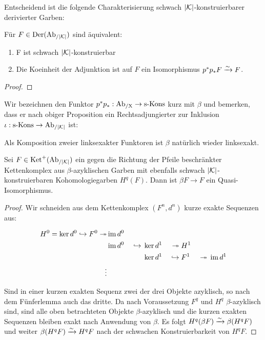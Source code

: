 Entscheidend ist die folgende Charakterisierung schwach
$|\mathcal{K}|$-konstruierbarer derivierter Garben:

\begin{prop}
  Für $F \in \operatorname{Der}(\operatorname{Ab}_{/|\mathcal{K}|})$ sind äquivalent:
  \begin{enumerate}
  \item F ist schwach $|\mathcal{K}|$-konstruierbar
  \item Die Koeinheit der Adjunktion ist auf $F$ ein Isomorphismus
    $p^*p_*F \xrightarrow{\sim} F$.
  \end{enumerate}
\end{prop}
\begin{proof}
\end{proof}


Wir bezeichnen den Funktor $p^*p_*: \operatorname{Ab_{/X}} \to \operatorname{s-Kons}$ kurz mit $\beta$
und bemerken, dass er nach obiger Proposition ein Rechtsadjungierter
zur Inklusion $\iota: \operatorname{s-Kons} \to \operatorname{Ab}_{/|\mathcal{K}|}$ ist:


Als Komposition zweier linksexakter Funktoren ist $\beta$ natürlich
wieder linksexakt. 

\begin{prop}
  Sei $F \in \operatorname{Ket}^+(\operatorname{Ab}_{/|\mathcal{K}|})$ ein gegen die Richtung der Pfeile
  beschränkter Kettenkomplex aus $\beta$-azyklischen Garben mit
  ebenfalls schwach $|\mathcal{K}|$-konstruierbaren Kohomologiegarben
  $H^q(F)$. Dann ist $\beta F \to F$ ein Quasi-Isomorphismus.
\end{prop}
\begin{proof}
  Wir schneiden aus dem Kettenkomplex $(F^n, d^n)$ kurze exakte
  Sequenzen aus:
  
  \begin{alignat*}{4}
    H^0 = \ker d^0 \hookrightarrow F^0 \twoheadrightarrow &\operatorname{im} d^0 & & \\
    &\operatorname{im} d^0& {} \hookrightarrow {} &\ker d^1& {}\twoheadrightarrow {} &H^1& \\
    && &\ker d^1& {} \hookrightarrow {} &F^1& {} \twoheadrightarrow {} \operatorname{im} d^1 \\
    \vdots
  \end{alignat*}
  
  Sind in einer kurzen exakten Sequenz zwei der drei Objekte
  azyklisch, so nach dem Fünferlemma auch das dritte. Da nach
  Voraussetzung $F^q$ und $H^q$ $\beta$-azyklisch sind, sind alle oben
  betrachteten Objekte $\beta$-azyklisch und die kurzen exakten
  Sequenzen bleiben exakt nach Anwendung von $\beta$. Es folgt
  $H^q(\beta F) \xrightarrow{\sim} \beta (H^q F)$ und weiter $\beta (H^q F) \xrightarrow{\sim} H^q
  F$ nach der schwachen Konstruierbarkeit von $H^q F$.
\end{proof}

